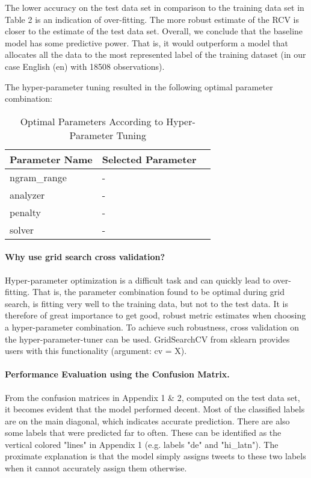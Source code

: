 \documentclass[fleqn,10pt]{SelfArx} %
\begin{document}
The lower accuracy on the test data set in comparison to the training data set in Table 2 is an indication of over-fitting. The more robust estimate of the RCV is closer to the estimate of the test data set. Overall, we conclude that the baseline model has some predictive power. That is, it would outperform a model that allocates all the data to the most represented label of the training dataset (in our case English (en) with 18508 observations). 

The hyper-parameter tuning resulted in the following optimal parameter combination:

\begin{table}[hbt]
	\caption{Optimal Parameters According to Hyper-Parameter Tuning}
	\centering
	\begin{tabular}{llr}
		\toprule
		 Parameter Name &  Selected Parameter\\
		\midrule
		ngram\_range & - \\
		analyzer & - \\
		penalty & - \\
		solver & - \\
		\bottomrule
	\end{tabular}
	\label{tab:label}
\end{table}

\paragraph{Why use grid search cross validation?} Hyper-parameter optimization is a difficult task and can quickly lead to over-fitting. That is, the parameter combination found to be optimal during grid search, is fitting very well to the training data, but not to the test data. It is therefore of great importance to get good, robust metric estimates when choosing a hyper-parameter combination. To achieve such robustness, cross validation on the hyper-parameter-tuner can be used. GridSearchCV from sklearn provides users with this functionality (argument: cv = X). 

\paragraph{Performance Evaluation using the Confusion Matrix.} From the confusion matrices in Appendix 1 \& 2, computed on the test data set, it becomes evident that the model performed decent. Most of the classified labels are on the main diagonal, which indicates accurate prediction. There are also some labels that were predicted far to often. These can be identified as the vertical colored "lines" in Appendix 1 (e.g. labels "de" and "hi\_latn"). The proximate explanation is that the model simply assigns tweets to these two labels when it cannot accurately assign them otherwise.
\end{document}
